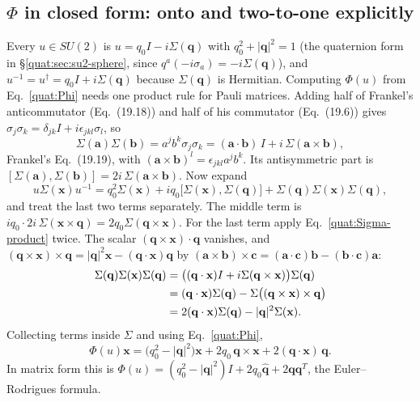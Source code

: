 \subsection{\texorpdfstring{$\Phi$}{Phi} in closed form: onto and two-to-one explicitly}\label{quat:sec:Phi-closed}
Every $u\in SU(2)$ is $u=q_0I-i\Sigma(\mathbf q)$ with
$q_0^2+|\mathbf q|^2=1$ (the quaternion form in
\S\ref{quat:sec:su2-sphere}, since $q^a(-i\sigma_a)=-i\Sigma(\mathbf q)$), and
$u^{-1}=u^\dagger=q_0I+i\Sigma(\mathbf q)$ because $\Sigma(\mathbf q)$ is
Hermitian. Computing $\Phi(u)$ from Eq.~\eqref{quat:Phi} needs one product
rule for Pauli matrices. Adding half of Frankel's anticommutator
(Eq.~(19.18)) and half of his commutator (Eq.~(19.6)) gives
$\sigma_j\sigma_k=\delta_{jk}I+i\epsilon_{jkl}\sigma_l$, so
\begin{equation}\label{quat:Sigma-product}
 \Sigma(\mathbf a)\Sigma(\mathbf b)=a^jb^k\sigma_j\sigma_k
 =(\mathbf a\cdot\mathbf b)\,I+i\,\Sigma(\mathbf a\times\mathbf b),
\end{equation}
Frankel's Eq.~(19.19), with $(\mathbf a\times\mathbf b)^l=\epsilon_{jkl}a^jb^k$.
Its antisymmetric part is
$[\Sigma(\mathbf a),\Sigma(\mathbf b)]=2i\,\Sigma(\mathbf a\times\mathbf b)$.
Now expand
\begin{equation}
 u\Sigma(\mathbf x)u^{-1}
 =q_0^2\Sigma(\mathbf x)
  +iq_0\bigl[\Sigma(\mathbf x),\Sigma(\mathbf q)\bigr]
  +\Sigma(\mathbf q)\Sigma(\mathbf x)\Sigma(\mathbf q),
\end{equation}
and treat the last two terms separately. The middle term is
$iq_0\cdot2i\,\Sigma(\mathbf x\times\mathbf q)=2q_0\Sigma(\mathbf q\times\mathbf x)$.
For the last term apply Eq.~\eqref{quat:Sigma-product} twice. The scalar
$(\mathbf q\times\mathbf x)\cdot\mathbf q$ vanishes, and
$(\mathbf q\times\mathbf x)\times\mathbf q=|\mathbf q|^2\mathbf x
-(\mathbf q\cdot\mathbf x)\mathbf q$ by
$(\mathbf a\times\mathbf b)\times\mathbf c=(\mathbf a\cdot\mathbf c)\mathbf b
-(\mathbf b\cdot\mathbf c)\mathbf a$:
\begin{align}
 \Sigma(\mathbf q)\Sigma(\mathbf x)\Sigma(\mathbf q)
 &=\bigl((\mathbf q\cdot\mathbf x)I+i\Sigma(\mathbf q\times\mathbf x)\bigr)
   \Sigma(\mathbf q)\notag\\
 &=(\mathbf q\cdot\mathbf x)\Sigma(\mathbf q)
   -\Sigma\bigl((\mathbf q\times\mathbf x)\times\mathbf q\bigr)\notag\\
 &=2(\mathbf q\cdot\mathbf x)\Sigma(\mathbf q)-|\mathbf q|^2\Sigma(\mathbf x).
\end{align}
Collecting terms inside $\Sigma$ and using Eq.~\eqref{quat:Phi},
\begin{equation}\label{quat:euler-rodrigues}
 \Phi(u)\mathbf x=\bigl(q_0^2-|\mathbf q|^2\bigr)\mathbf x
 +2q_0\,\mathbf q\times\mathbf x+2(\mathbf q\cdot\mathbf x)\,\mathbf q .
\end{equation}
In matrix form this is
$\Phi(u)=(q_0^2-|\mathbf q|^2)I+2q_0\widehat{\mathbf q}+2\mathbf q\mathbf q^T$,
the Euler--Rodrigues formula.

